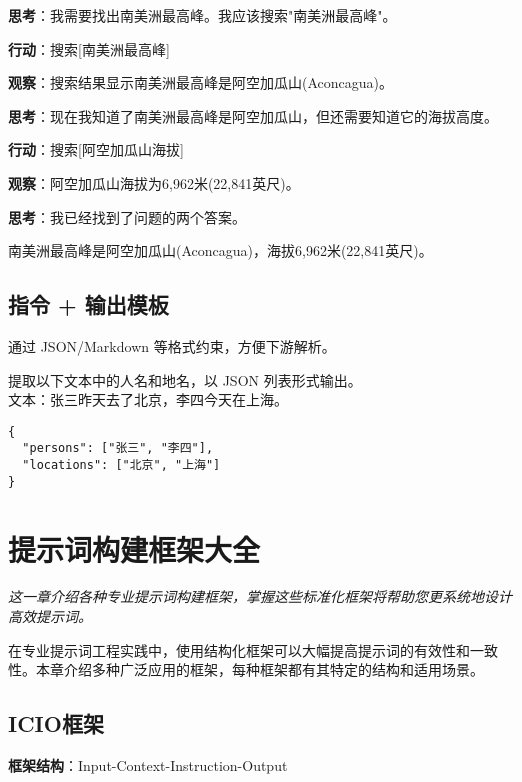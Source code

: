 \documentclass[12pt]{ctexart}
\newcommand{\chapternote}[1]{\vspace{-0.3cm}\par\noindent\textit{\small #1}\vspace{0.3cm}}
\begin{document}
\begin{outputbox}
\textbf{思考}：我需要找出南美洲最高峰。我应该搜索"南美洲最高峰"。

\textbf{行动}：搜索[南美洲最高峰]

\textbf{观察}：搜索结果显示南美洲最高峰是阿空加瓜山(Aconcagua)。

\textbf{思考}：现在我知道了南美洲最高峰是阿空加瓜山，但还需要知道它的海拔高度。

\textbf{行动}：搜索[阿空加瓜山海拔]

\textbf{观察}：阿空加瓜山海拔为6,962米(22,841英尺)。

\textbf{思考}：我已经找到了问题的两个答案。

南美洲最高峰是阿空加瓜山(Aconcagua)，海拔6,962米(22,841英尺)。
\end{outputbox}

\subsection{指令 + 输出模板}
通过 JSON/Markdown 等格式约束，方便下游解析。
\begin{promptbox}
提取以下文本中的人名和地名，以 JSON 列表形式输出。\\
文本：张三昨天去了北京，李四今天在上海。
\end{promptbox}
\begin{outputbox}
\begin{lstlisting}
{
  "persons": ["张三", "李四"],
  "locations": ["北京", "上海"]
}
\end{lstlisting}
\end{outputbox}

\section{提示词构建框架大全}
\chapternote{这一章介绍各种专业提示词构建框架，掌握这些标准化框架将帮助您更系统地设计高效提示词。}

在专业提示词工程实践中，使用结构化框架可以大幅提高提示词的有效性和一致性。本章介绍多种广泛应用的框架，每种框架都有其特定的结构和适用场景。

\subsection{ICIO框架}

\textbf{框架结构}：Input-Context-Instruction-Output
\end{document}
